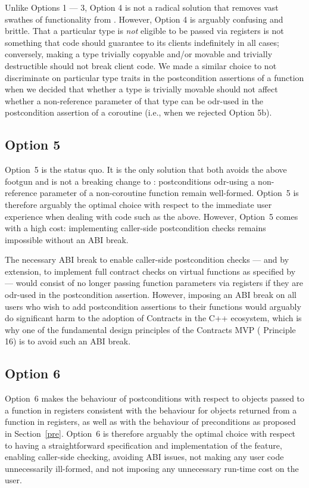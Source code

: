 Unlike Options 1 --- 3, Option 4 is not a radical solution that removes vast swathes of functionality from \cite{P2900R10}. However, Option 4 is arguably confusing and brittle. That a particular type is \emph{not} eligible to be passed via registers is not something that code should guarantee to its clients indefinitely in all cases; conversely, making a type trivially copyable and/or movable and trivially destructible should not break client code. We made a similar choice to not discriminate on particular type traits in the postcondition assertions of a function when we decided that whether a type is trivially movable should not affect whether a non-reference parameter of that type can be odr-used in the postcondition assertion of a coroutine (i.e., when we rejected \cite{P3387R0} Option 5b).

\subsection*{Option 5}

Option~5 is the status quo. It is the only solution that both avoids the above footgun and is not a breaking change to \cite{P2900R10}: postconditions odr-using a  non-reference parameter of a non-coroutine function remain well-formed. Option~5 is therefore arguably the optimal choice with respect to the immediate user experience when dealing with code such as the above. However, Option~5 comes with a high cost: implementing caller-side postcondition checks remains impossible without an ABI break.

The necessary ABI break to enable caller-side postcondition checks --- and by extension, to implement full contract checks on virtual functions as specified by \cite{P2900R10} --- would consist of no longer passing function parameters via registers if they are odr-used in the postcondition assertion. However, imposing an ABI break on all users who wish to add postcondition assertions to their functions would arguably do significant harm to the adoption of Contracts in the C++ ecosystem, which is why one of the fundamental design principles of the Contracts MVP (\cite{P2900R10} Principle 16) is to avoid such an ABI break.

\subsection*{Option 6}

Option~6 makes the behaviour of postconditions with respect to objects passed to a function in registers consistent with the behaviour for objects returned from a function in registers, as well as with the behaviour of preconditions as proposed in Section~\ref{pre}. Option~6 is therefore arguably the optimal choice with respect to having a straightforward specification and implementation of the feature, enabling caller-side checking, avoiding ABI issues, not making any user code unnecessarily ill-formed, and not imposing any unnecessary run-time cost on the user.

